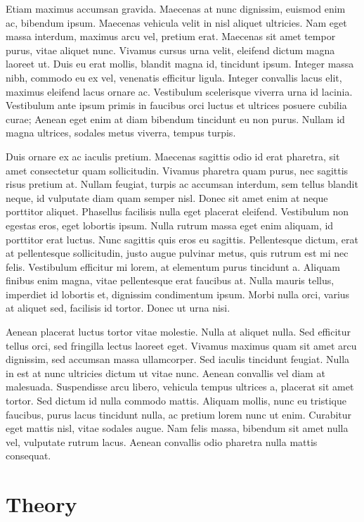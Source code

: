 \documentclass[
  12pt,
]{article}
\begin{document}
Etiam maximus accumsan gravida. Maecenas at nunc dignissim, euismod enim
ac, bibendum ipsum. Maecenas vehicula velit in nisl aliquet ultricies.
Nam eget massa interdum, maximus arcu vel, pretium erat. Maecenas sit
amet tempor purus, vitae aliquet nunc. Vivamus cursus urna velit,
eleifend dictum magna laoreet ut. Duis eu erat mollis, blandit magna id,
tincidunt ipsum. Integer massa nibh, commodo eu ex vel, venenatis
efficitur ligula. Integer convallis lacus elit, maximus eleifend lacus
ornare ac. Vestibulum scelerisque viverra urna id lacinia. Vestibulum
ante ipsum primis in faucibus orci luctus et ultrices posuere cubilia
curae; Aenean eget enim at diam bibendum tincidunt eu non purus. Nullam
id magna ultrices, sodales metus viverra, tempus turpis.

Duis ornare ex ac iaculis pretium. Maecenas sagittis odio id erat
pharetra, sit amet consectetur quam sollicitudin. Vivamus pharetra quam
purus, nec sagittis risus pretium at. Nullam feugiat, turpis ac accumsan
interdum, sem tellus blandit neque, id vulputate diam quam semper nisl.
Donec sit amet enim at neque porttitor aliquet. Phasellus facilisis
nulla eget placerat eleifend. Vestibulum non egestas eros, eget lobortis
ipsum. Nulla rutrum massa eget enim aliquam, id porttitor erat luctus.
Nunc sagittis quis eros eu sagittis. Pellentesque dictum, erat at
pellentesque sollicitudin, justo augue pulvinar metus, quis rutrum est
mi nec felis. Vestibulum efficitur mi lorem, at elementum purus
tincidunt a. Aliquam finibus enim magna, vitae pellentesque erat
faucibus at. Nulla mauris tellus, imperdiet id lobortis et, dignissim
condimentum ipsum. Morbi nulla orci, varius at aliquet sed, facilisis id
tortor. Donec ut urna nisi.

Aenean placerat luctus tortor vitae molestie. Nulla at aliquet nulla.
Sed efficitur tellus orci, sed fringilla lectus laoreet eget. Vivamus
maximus quam sit amet arcu dignissim, sed accumsan massa ullamcorper.
Sed iaculis tincidunt feugiat. Nulla in est at nunc ultricies dictum ut
vitae nunc. Aenean convallis vel diam at malesuada. Suspendisse arcu
libero, vehicula tempus ultrices a, placerat sit amet tortor. Sed dictum
id nulla commodo mattis. Aliquam mollis, nunc eu tristique faucibus,
purus lacus tincidunt nulla, ac pretium lorem nunc ut enim. Curabitur
eget mattis nisl, vitae sodales augue. Nam felis massa, bibendum sit
amet nulla vel, vulputate rutrum lacus. Aenean convallis odio pharetra
nulla mattis consequat.

\section{Theory}\label{theory}
\end{document}
